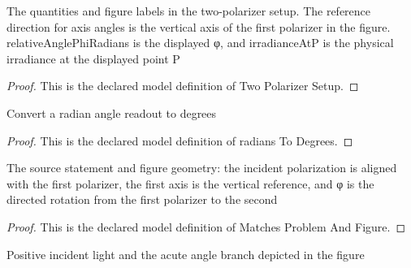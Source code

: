 \begin{definition}
  \label{def:physics:phyx-mini-0094:phyxminiproblems-problemphyxmini0094-twopolarizersetup}
  The quantities and figure labels in the two-polarizer setup. The reference direction for axis angles is the vertical axis of the first polarizer in the figure. relativeAnglePhiRadians is the displayed φ, and irradianceAtP is the physical irradiance at the displayed point P
\end{definition}
\begin{proof}
  This is the declared model definition of Two Polarizer Setup.
\end{proof}
\begin{definition}
  \label{def:physics:phyx-mini-0094:phyxminiproblems-problemphyxmini0094-radianstodegrees}
  Convert a radian angle readout to degrees
\end{definition}
\begin{proof}
  This is the declared model definition of radians To Degrees.
\end{proof}
\begin{definition}
  \label{def:physics:phyx-mini-0094:phyxminiproblems-problemphyxmini0094-matchesproblemandfigure}
  The source statement and figure geometry: the incident polarization is aligned with the first polarizer, the first axis is the vertical reference, and φ is the directed rotation from the first polarizer to the second
\end{definition}
\begin{proof}
  This is the declared model definition of Matches Problem And Figure.
\end{proof}
\begin{definition}
  \label{def:physics:phyx-mini-0094:phyxminiproblems-problemphyxmini0094-hasphysicalparameters}
  Positive incident light and the acute angle branch depicted in the figure
\end{definition}
